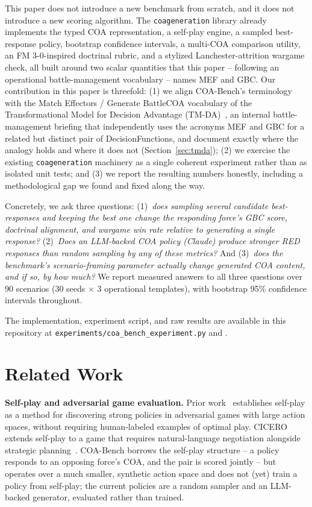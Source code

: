 \documentclass[sigconf]{acmart}
\begin{document}
This paper does not introduce a new benchmark from scratch, and it does not introduce a new scoring algorithm. The \texttt{coageneration} library already implements the typed COA representation, a self-play engine, a sampled best-response policy, bootstrap confidence intervals, a multi-COA comparison utility, an FM 3-0-inspired doctrinal rubric, and a stylized Lanchester-attrition wargame check, all built around two scalar quantities that this paper -- following an operational battle-management vocabulary -- names MEF and GBC. Our contribution in this paper is threefold: (1) we align COA-Bench's terminology with the Match Effectors / Generate BattleCOA vocabulary of the Transformational Model for Decision Advantage (TM-DA)~\cite{tmda2025bootcamp}, an internal battle-management briefing that independently uses the acronyms MEF and GBC for a related but distinct pair of DecisionFunctions, and document exactly where the analogy holds and where it does not (Section~\ref{sec:tmda}); (2) we exercise the existing \texttt{coageneration} machinery as a single coherent experiment rather than as isolated unit tests; and (3) we report the resulting numbers honestly, including a methodological gap we found and fixed along the way.

Concretely, we ask three questions: (1)~\emph{does sampling several candidate best-responses and keeping the best one change the responding force's GBC score, doctrinal alignment, and wargame win rate relative to generating a single response?} (2)~\emph{Does an LLM-backed COA policy (Claude) produce stronger RED responses than random sampling by any of these metrics?} And (3)~\emph{does the benchmark's scenario-framing parameter actually change generated COA content, and if so, by how much?} We report measured answers to all three questions over 90 scenarios (30 seeds $\times$ 3 operational templates), with bootstrap 95\% confidence intervals throughout.

The implementation, experiment script, and raw results are available in this repository at \texttt{experiments/coa\_bench\_experiment.py} and .

\section{Related Work}

\textbf{Self-play and adversarial game evaluation.} Prior work~\cite{silver2018alphazero,vinyals2019alphastar,brown2019superhuman} establishes self-play as a method for discovering strong policies in adversarial games with large action spaces, without requiring human-labeled examples of optimal play. CICERO extends self-play to a game that requires natural-language negotiation alongside strategic planning~\cite{bakhtin2022cicero}. COA-Bench borrows the self-play structure -- a policy responds to an opposing force's COA, and the pair is scored jointly -- but operates over a much smaller, synthetic action space and does not (yet) train a policy from self-play; the current policies are a random sampler and an LLM-backed generator, evaluated rather than trained.
\end{document}

